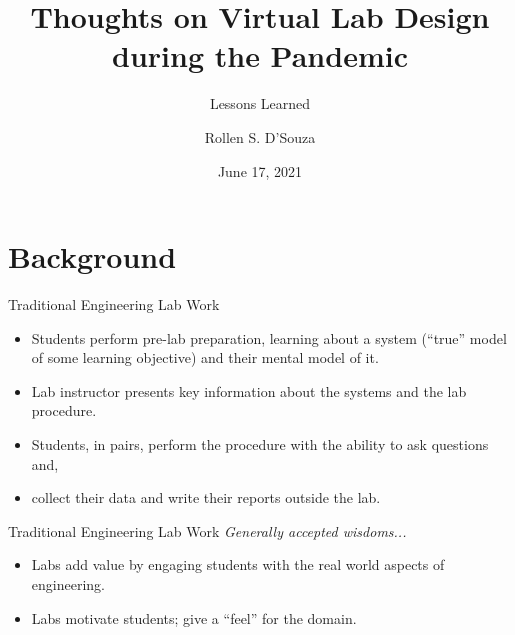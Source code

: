\documentclass{beamer}
\title[Virtual Lab Design and Lessons Learned]{%
  Thoughts on Virtual Lab Design during the Pandemic
}
\subtitle{Lessons Learned}
\author[R. S. D'Souza --- rollen.dsouza@uwaterloo.ca]{%
  Rollen S. D'Souza
}
\date{June 17, 2021}
\begin{document}
\frame{\titlepage}

\section{Background}

\begin{frame}{Traditional Engineering Lab Work}
  \begin{itemize}
    \item{
      Students perform pre-lab preparation, learning about a system (``true'' model of some learning objective) and their mental model of it.
    }
    \item{
      Lab instructor presents key information about the systems and the lab procedure.
    }
    \item{
      Students, in pairs, perform the procedure with the ability to ask questions and,
    }
    \item{
      collect their data and write their reports outside the lab.
    }
  \end{itemize}
\end{frame}

\begin{frame}{Traditional Engineering Lab Work}
  \emph{Generally accepted wisdoms...}
  \begin{itemize}
    \item{
      Labs add value by engaging students with the real world aspects of engineering.
    }
    \pause
    \item{
      Labs motivate students; give a ``feel'' for the domain.
    }
  \end{itemize}
\end{frame}
\end{document}

